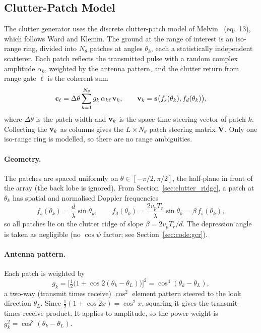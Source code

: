 \documentclass{article}
\begin{document}
\subsection{Clutter-Patch Model}\label{sec:code:model}

The clutter generator uses the discrete clutter-patch model of Melvin~\cite{Melvin2004} (eq.~13), which follows Ward and Klemm. The ground at the range of interest is an iso-range ring, divided into $N_\theta$ patches at angles $\theta_k$, each a statistically independent scatterer. Each patch reflects the transmitted pulse with a random complex amplitude $\alpha_k$, weighted by the antenna pattern, and the clutter return from range gate $\ell$ is the coherent sum
\begin{equation}
  \vb c_\ell = \Delta\theta \sum_{k=1}^{N_\theta} g_k\,\alpha_{k\ell}\,\vb v_k,
  \qquad \vb v_k = \vb s\big(f_s(\theta_k), f_d(\theta_k)\big),
  \label{eq:code:patchsum}
\end{equation}
where $\Delta\theta$ is the patch width and $\vb v_k$ is the space-time steering vector of patch $k$. Collecting the $\vb v_k$ as columns gives the $L\times N_\theta$ patch steering matrix $\mathbf{V}$. Only one iso-range ring is modelled, so there are no range ambiguities.

\paragraph{Geometry.} The patches are spaced uniformly on $\theta\in[-\pi/2,\pi/2]$, the half-plane in front of the array (the back lobe is ignored). From Section~\ref{sec:clutter_ridge}, a patch at $\theta_k$ has spatial and normalised Doppler frequencies
\begin{equation}
  f_s(\theta_k) = \frac{d}{\lambda}\sin\theta_k, \qquad
  f_d(\theta_k) = \frac{2v_pT_r}{\lambda}\sin\theta_k = \beta\, f_s(\theta_k),
  \label{eq:code:freqs}
\end{equation}
so all patches lie on the clutter ridge of slope $\beta = 2v_pT_r/d$. The depression angle is taken as negligible (no $\cos\psi$ factor; see Section~\ref{sec:code:gcr}).

\paragraph{Antenna pattern.} Each patch is weighted by
\begin{equation}
  g_k = \Big[\tfrac12\big(1+\cos 2(\theta_k-\theta_L)\big)\Big]^2 = \cos^4(\theta_k-\theta_L),
\end{equation}
a two-way (transmit times receive) $\cos^2$ element pattern steered to the look direction $\theta_L$. Since $\tfrac12(1+\cos2x)=\cos^2x$, squaring it gives the transmit-times-receive product. It applies to amplitude, so the power weight is $g_k^2=\cos^8(\theta_k-\theta_L)$.
\end{document}
